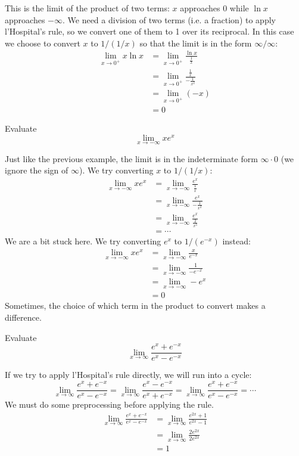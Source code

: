 \begin{solution}
  This is the limit of the product of two terms: $x$ approaches 0 while $\ln x$ approaches $-\infty$. We need a division of two terms (i.e. a fraction) to apply l'Hospital's rule, so we convert one of them to 1 over its reciprocal. In this case we choose to convert $x$ to $1/(1/x)$ so that the limit is in the form $\infty / \infty$:
  \begin{align*}
    \lim_{x \to 0 ^ +} x \ln x &= \lim_{x \to 0 ^ +} \frac{\ln x}{\frac{1}{x}} \\ 
    &= \lim_{x \to 0 ^ +} \frac{\frac{1}{x}}{-\frac{1}{x ^ 2}} \\ 
    &= \lim_{x \to 0 ^ +} (-x) \\ 
    &= 0
  \end{align*}
\end{solution}
\begin{eg}
  Evaluate
  \[
    \lim_{x \to -\infty} xe ^ x
  \]
\end{eg}
\begin{solution}
  Just like the previous example, the limit is in the indeterminate form $\infty \cdot 0$ (we ignore the sign of $\infty$). We try converting $x$ to $1/(1/x)$:
  \begin{align*}
    \lim_{x \to -\infty} xe ^ x &= \lim_{x \to -\infty} \frac{e ^ x}{\frac{1}{x}} \\ 
    &= \lim_{x \to -\infty} \frac{e ^ x}{-\frac{1}{x ^ 2}} \\ 
    &= \lim_{x \to -\infty} \frac{e ^ x}{\frac{2}{x ^ 3}} \\ 
    &= \cdots
  \end{align*}
  We are a bit stuck here. We try converting $e ^ x$ to $1/(e ^ {-x})$ instead:
  \begin{align*}
    \lim_{x \to -\infty} xe ^ x &= \lim_{x \to -\infty} \frac{x}{e ^ {-x}} \\ 
    &= \lim_{x \to -\infty} \frac{1}{-e ^ {-x}} \\ 
    &= \lim_{x \to -\infty} -e ^ x \\ 
    &= 0
  \end{align*}
  Sometimes, the choice of which term in the product to convert makes a difference.
\end{solution}
\begin{eg}
  Evaluate
  \[
    \lim_{x \to \infty} \frac{e ^ x + e ^ {-x}}{e ^ x - e ^ {-x}}
  \]
\end{eg}
\begin{solution}
  If we try to apply l'Hospital's rule directly, we will run into a cycle:
  \[
    \lim_{x \to \infty} \frac{e ^ x + e ^ {-x}}{e ^ x - e ^ {-x}} = \lim_{x \to \infty} \frac{e ^ x - e ^ {-x}}{e ^ x + e ^ {-x}} = \lim_{x \to \infty} \frac{e ^ x + e ^ {-x}}{e ^ x - e ^ {-x}} = \cdots
  \]
  We must do some preprocessing before applying the rule.
  \begin{align*}
    \lim_{x \to \infty} \frac{e ^ x + e ^ {-x}}{e ^ x - e ^ {-x}} &= \lim_{x \to \infty} \frac{e ^ {2x} + 1}{e ^ {2x} - 1} \\ 
    &= \lim_{x \to \infty} \frac{2e ^ {2x}}{2e ^ {2x}} \\ 
    &= 1
  \end{align*}
\end{solution}
